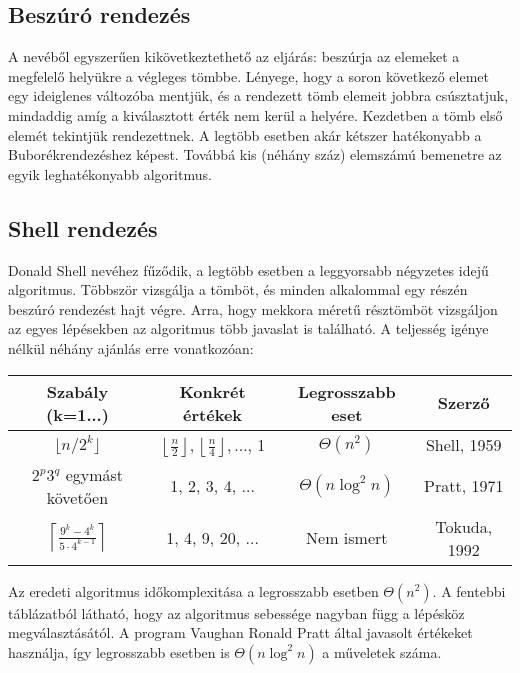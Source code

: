 \documentclass{elteikthesis}
\begin{document}
\subsection{Beszúró rendezés}
A nevéből egyszerűen kikövetkeztethető az eljárás: beszúrja az elemeket a megfelelő helyükre a végleges tömbbe. Lényege, hogy a soron következő elemet egy ideiglenes változóba mentjük, és a rendezett tömb elemeit jobbra csúsztatjuk, mindaddig amíg a kiválasztott érték nem kerül a helyére. Kezdetben a tömb első elemét tekintjük rendezettnek. A legtöbb esetben akár kétszer hatékonyabb a Buborékrendezéshez képest\cite{Fekete}. Továbbá kis (néhány száz) elemszámú bemenetre az egyik leghatékonyabb algoritmus.

\subsection{Shell rendezés}
Donald Shell nevéhez fűződik, a legtöbb esetben a leggyorsabb négyzetes idejű algoritmus. Többször vizsgálja a tömböt, és minden alkalommal egy részén beszúró rendezést hajt végre. Arra, hogy mekkora méretű résztömböt vizsgáljon az egyes lépésekben az algoritmus több javaslat is található. A teljesség igénye nélkül néhány ajánlás\cite{ShellWiki} erre vonatkozóan:\par
\begin{table}[h]
	\def\arraystretch{2}
	\centering
	\begin{tabular}{|c|c|c|c|}
		\hline
		\textbf{Szabály (k=1...)} & \textbf{Konkrét értékek}  & \textbf{Legrosszabb eset} & \textbf{Szerző}         \\ \hline
		$\lfloor n / 2^k \rfloor$&      $\left\lfloor\frac{n}{2}\right\rfloor,
		\left\lfloor\frac{n}{4}\right\rfloor, \ldots$, 1            &              $\Theta(n^2)$                      & Shell, 1959     \\ \hline
		$2^p 3^q$ egymást követően & 1, 2, 3, 4, $\ldots$  &               $\Theta(n \log^2 n)$                     & Pratt, 1971     \\ \hline
		$\left\lceil \frac{9^k-4^k}{5\cdot4^{k-1}} \right\rceil$& 1, 4, 9, 20, $\ldots$ &             Nem ismert                       & Tokuda, 1992	\\ \hline
	\end{tabular}
\end{table}
 Az eredeti algoritmus időkomplexitása a legrosszabb esetben $\Theta(n^2)$. A fentebbi táblázatból látható, hogy az algoritmus sebessége nagyban függ a lépésköz megválasztásától. A program Vaughan Ronald Pratt által javasolt értékeket\cite{Pratt} használja, így legrosszabb esetben is $\Theta(n \log^2 n)$ a műveletek száma.
\end{document}
